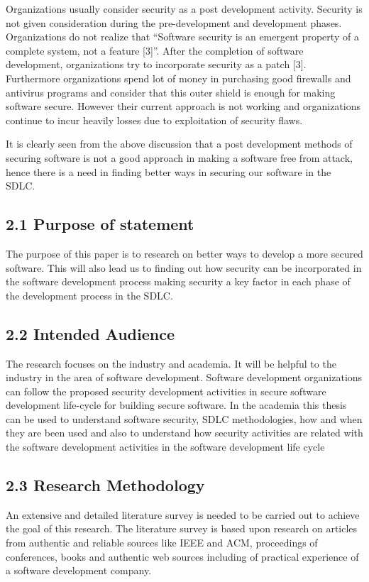 \documentclass[12pt]{extreport}
\begin{document}
Organizations usually consider security as a post development activity. Security is not given consideration during the pre-development and development phases. Organizations do not realize that “Software security is an emergent property of a complete system, not a feature [3]”. After the completion of software development, organizations try to incorporate security as a patch [3]. Furthermore organizations
spend lot of money in purchasing good firewalls and antivirus programs and consider that this outer shield is enough for making software secure. However their current approach is not working and organizations continue to incur heavily losses due to exploitation of security flaws.

It is clearly seen from the above discussion that a post development methods of securing software is not a good approach in making a software free from attack, hence there is a need in finding better ways in securing our software in the SDLC.

\subsection*{2.1 Purpose of statement}
The purpose of this paper is to research on better ways to develop a more secured software. This will also lead us to finding out how security can be incorporated in the software development process making security a key factor in each phase of the development process in the SDLC.

\subsection*{2.2 Intended Audience}
The research focuses on the industry and academia. It will be helpful to the industry in the area of software development. Software development organizations can follow the proposed security development activities in secure software development life-cycle for building secure software. In the academia this thesis can be used to understand software security, SDLC methodologies, how and when they are been used and also to understand how security activities are related with the software development activities in the software development life cycle
\subsection*{2.3 Research Methodology}
An extensive and detailed literature survey is needed to be carried out to achieve the goal of this research. The literature survey is based upon research on articles from authentic and reliable sources like IEEE and ACM, proceedings of conferences, books and authentic web sources including of practical experience of a software development company.
\end{document}
